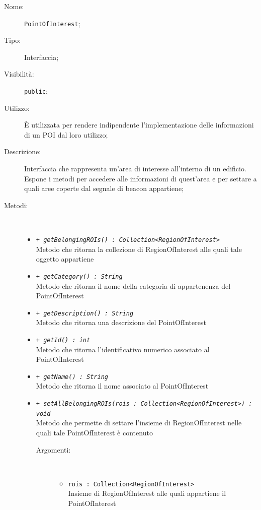 \documentclass[../DefinizioneDiProdotto.tex]{subfiles}
\begin{document}
    \begin{description}
\item[Nome:] \texttt{PointOfInterest};
\item[Tipo:] Interfaccia;
\item[Visibilità:] \texttt{public};
\item[Utilizzo:] È utilizzata per rendere indipendente l'implementazione delle informazioni di un POI dal loro utilizzo;
\item[Descrizione:] Interfaccia che rappresenta un'area di interesse all'interno di un edificio. Espone i metodi per accedere alle informazioni di quest'area e per settare a quali aree coperte dal segnale di beacon appartiene;
\item[Metodi:] \
\begin{itemize}
\item \texttt{+ \textit{getBelongingROIs() : Collection<RegionOfInterest>}}\\
Metodo che ritorna la collezione di RegionOfInterest alle quali tale oggetto appartiene
 \item \texttt{+ \textit{getCategory() : String}}\\
Metodo che ritorna il nome della categoria di appartenenza del PointOfInterest
 \item \texttt{+ \textit{getDescription() : String}}\\
Metodo che ritorna una descrizione del PointOfInterest
 \item \texttt{+ \textit{getId() : int}}\\
Metodo che ritorna l'identificativo numerico associato al PointOfInterest
 \item \texttt{+ \textit{getName() : String}}\\
Metodo che ritorna il nome associato al PointOfInterest
 \item \texttt{+ \textit{setAllBelongingROIs(rois : Collection<RegionOfInterest>) : void}}\\
Metodo che permette di settare l'insieme di RegionOfInterest nelle quali tale PointOfInterest è contenuto
 \begin{description}
\item[Argomenti:] \
\begin{itemize}
\item \texttt{rois : Collection<RegionOfInterest>}\\
Insieme di RegionOfInterest alle quali appartiene il PointOfInterest\end{itemize}
\end{description}
\end{itemize}
\end{description}
\end{document}
